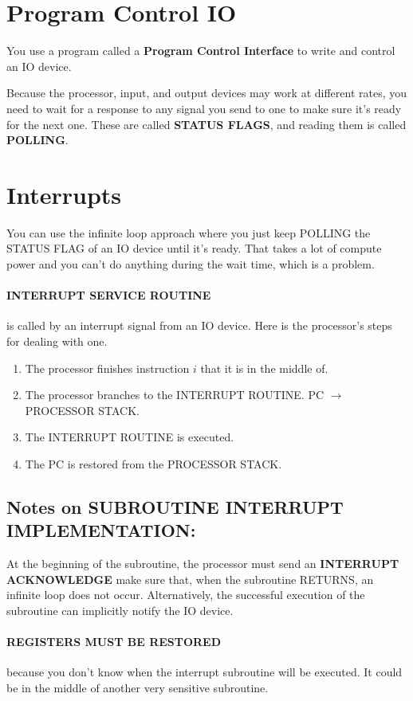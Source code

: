 \documentclass[a4paper,12pt]{report}
\begin{document}
\section{Program Control IO}
You use a program called a \textbf{Program Control Interface} to write and control an IO device. 

Because the processor, input, and output devices may work at different rates, you need to wait for a response to any signal you 
send to one to make sure it's ready for the next one. These are called \textbf{STATUS FLAGS}, and reading them is called \textbf{POLLING}. 


\section{Interrupts}
You can use the infinite loop approach where you just keep POLLING the STATUS FLAG of an IO device until it's ready. That takes a lot of 
compute power and you can't do anything during the wait time, which is a problem.

\paragraph{INTERRUPT SERVICE ROUTINE } is called by an interrupt signal from an IO device. Here is the processor's steps for dealing with one.
\begin{enumerate}
\item The processor finishes instruction $i$ that it is in the middle of.
\item The processor branches to the INTERRUPT ROUTINE. PC $\to$ PROCESSOR STACK.
\item The INTERRUPT ROUTINE is executed.
\item The PC is restored from the PROCESSOR STACK.
\end{enumerate}

\subsection{Notes on SUBROUTINE INTERRUPT IMPLEMENTATION: } 
At the beginning of the subroutine, the processor must send an \textbf{INTERRUPT ACKNOWLEDGE} make sure that, when the subroutine RETURNS, 
an infinite loop does not occur. Alternatively, the successful execution of the subroutine can implicitly notify the IO device.

\paragraph{REGISTERS MUST BE RESTORED } because you don't know when the interrupt subroutine will be executed. It could be in the middle of another 
very sensitive subroutine. 
\end{document}
